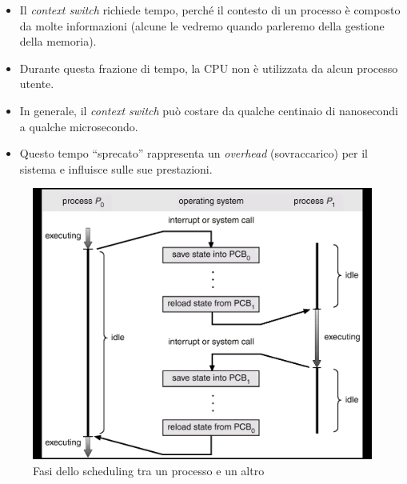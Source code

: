 \begin{itemize}
    \item Il \textit{context switch} richiede tempo, perché il contesto di un processo è composto da molte informazioni (alcune le vedremo quando parleremo della gestione della memoria).
    \item Durante questa frazione di tempo, la CPU non è utilizzata da alcun processo utente.
    \item In generale, il \textit{context switch} può costare da qualche centinaio di nanosecondi a qualche microsecondo.
    \item Questo tempo “sprecato” rappresenta un \textit{overhead} (sovraccarico) per il sistema e influisce sulle sue prestazioni.
\end{itemize}

\begin{figure}[h]
    \centering
    \includegraphics[width=0.5\linewidth]{images/Phases_of_scheduling.png}
    \caption{Fasi dello scheduling tra un processo e un altro}
\end{figure}

